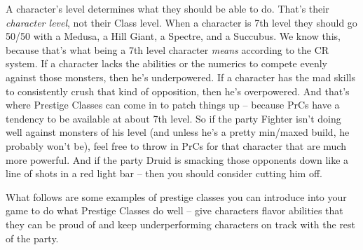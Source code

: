 \documentclass[10pt]{report}
\begin{document}
A character's level determines what they should be able to do. That's their \emph{character level}, not their Class level. When a character is 7th level they should go 50/50 with a Medusa, a Hill Giant, a Spectre, and a Succubus. We know this, because that's what being a 7th level character \emph{means} according to the CR system. If a character lacks the abilities or the numerics to compete evenly against those monsters, then he's underpowered. If a character has the mad skills to consistently crush that kind of opposition, then he's overpowered. And that's where Prestige Classes can come in to patch things up -- because PrCs have a tendency to be available at about 7th level. So if the party Fighter isn't doing well against monsters of his level (and unless he's a pretty min/maxed build, he probably won't be), feel free to throw in PrCs for that character that are much more powerful. And if the party Druid is smacking those opponents down like a line of shots in a red light bar -- then you should consider cutting him off.

What follows are some examples of prestige classes you can introduce into your game to do what Prestige Classes do well -- give characters flavor abilities that they can be proud of and keep underperforming characters on track with the rest of the party.



















\end{document}
